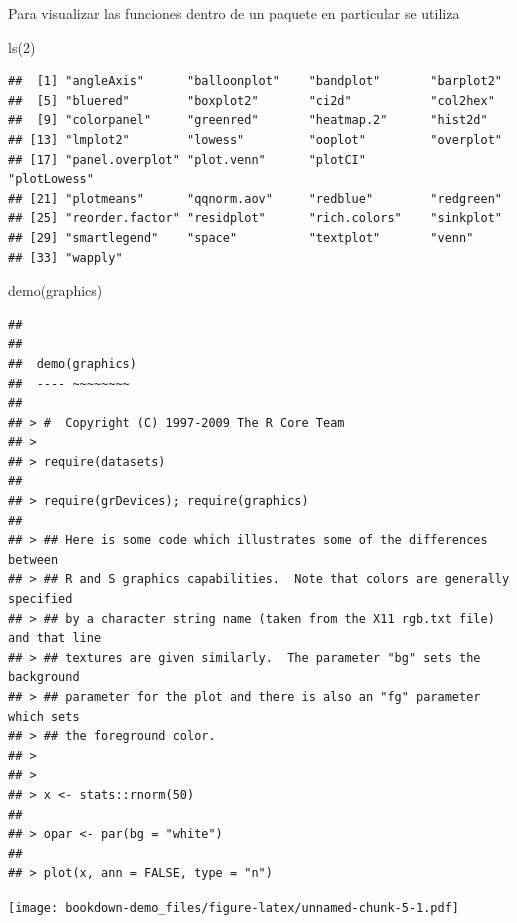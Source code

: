 \documentclass[
]{book}
\newenvironment{Shaded}{\begin{snugshade}}{\end{snugshade}}
\newcommand{\DecValTok}[1]{\textcolor[rgb]{0.00,0.00,0.81}{#1}}
\newcommand{\FunctionTok}[1]{\textcolor[rgb]{0.00,0.00,0.00}{#1}}
\newcommand{\NormalTok}[1]{#1}
\begin{document}
Para visualizar las funciones dentro de un paquete en particular se utiliza

\begin{Shaded}
\begin{Highlighting}[]
\FunctionTok{ls}\NormalTok{(}\DecValTok{2}\NormalTok{)}
\end{Highlighting}
\end{Shaded}

\begin{verbatim}
##  [1] "angleAxis"      "balloonplot"    "bandplot"       "barplot2"      
##  [5] "bluered"        "boxplot2"       "ci2d"           "col2hex"       
##  [9] "colorpanel"     "greenred"       "heatmap.2"      "hist2d"        
## [13] "lmplot2"        "lowess"         "ooplot"         "overplot"      
## [17] "panel.overplot" "plot.venn"      "plotCI"         "plotLowess"    
## [21] "plotmeans"      "qqnorm.aov"     "redblue"        "redgreen"      
## [25] "reorder.factor" "residplot"      "rich.colors"    "sinkplot"      
## [29] "smartlegend"    "space"          "textplot"       "venn"          
## [33] "wapply"
\end{verbatim}

\begin{Shaded}
\begin{Highlighting}[]
\FunctionTok{demo}\NormalTok{(graphics)}
\end{Highlighting}
\end{Shaded}

\begin{verbatim}
## 
## 
##  demo(graphics)
##  ---- ~~~~~~~~
## 
## > #  Copyright (C) 1997-2009 The R Core Team
## > 
## > require(datasets)
## 
## > require(grDevices); require(graphics)
## 
## > ## Here is some code which illustrates some of the differences between
## > ## R and S graphics capabilities.  Note that colors are generally specified
## > ## by a character string name (taken from the X11 rgb.txt file) and that line
## > ## textures are given similarly.  The parameter "bg" sets the background
## > ## parameter for the plot and there is also an "fg" parameter which sets
## > ## the foreground color.
## > 
## > 
## > x <- stats::rnorm(50)
## 
## > opar <- par(bg = "white")
## 
## > plot(x, ann = FALSE, type = "n")
\end{verbatim}

\texttt{[image: bookdown-demo\_files/figure-latex/unnamed-chunk-5-1.pdf]}
\end{document}
